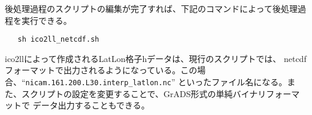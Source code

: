  \noindent 後処理過程のスクリプトの編集が完了すれば、下記のコマンドによって後処理過程を実行できる。
 \begin{verbatim}
   sh ico2ll_netcdf.sh
 \end{verbatim}


 \noindent ico2llによって作成されるLatLon格子hデータは、現行のスクリプトでは、
netcdfフォーマットで出力されるようになっている。この場合、``\verb|nicam.161.200.L30.interp_latlon.nc|''
といったファイル名になる。また、スクリプトの設定を変更することで、GrADS形式の単純バイナリフォーマットで
データ出力することもできる。

